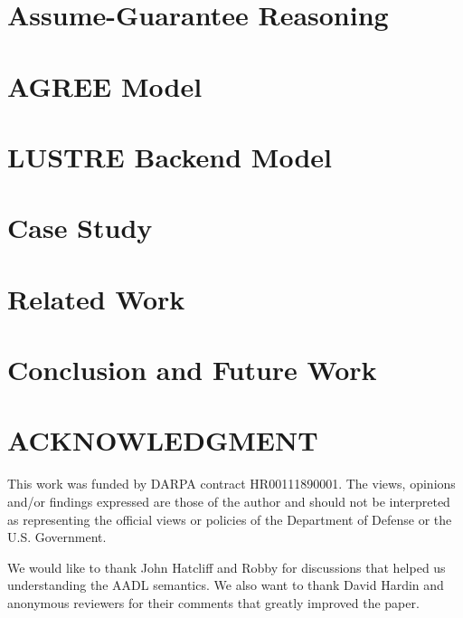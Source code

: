 \documentclass[runningheads]{llncs}
\begin{document}
\section{Assume-Guarantee Reasoning}


\section{AGREE Model}
\label{agree}


\section{LUSTRE Backend Model}
\label{lustre}


\section{Case Study}
\label{case-study}


\section{Related Work}
\label{rw}


\section{Conclusion and Future Work}
\label{conclusion}


\section*{ACKNOWLEDGMENT}
This work was funded by DARPA contract HR00111890001. The
views, opinions and/or findings expressed are those of the author
and should not be interpreted as representing the official views or
policies of the Department of Defense or the U.S. Government.

We would like to thank John Hatcliff and Robby for discussions that helped us understanding the AADL semantics.
We also want to thank David Hardin and anonymous reviewers for their comments that greatly improved the paper.

%
%
%


%
\end{document}
